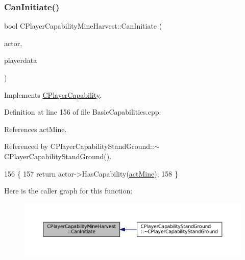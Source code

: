 \subsubsection{\texorpdfstring{Can\+Initiate()}{CanInitiate()}}
{\footnotesize\ttfamily bool C\+Player\+Capability\+Mine\+Harvest\+::\+Can\+Initiate (\begin{DoxyParamCaption}\item[{std\+::shared\+\_\+ptr$<$ \hyperlink{classCPlayerAsset}{C\+Player\+Asset} $>$}]{actor,  }\item[{std\+::shared\+\_\+ptr$<$ \hyperlink{classCPlayerData}{C\+Player\+Data} $>$}]{playerdata }\end{DoxyParamCaption})\hspace{0.3cm}{\ttfamily [virtual]}}



Implements \hyperlink{classCPlayerCapability_aa83b1e1fcaff2985c378132d679154ea}{C\+Player\+Capability}.



Definition at line 156 of file Basic\+Capabilities.\+cpp.



References act\+Mine.



Referenced by C\+Player\+Capability\+Stand\+Ground\+::$\sim$\+C\+Player\+Capability\+Stand\+Ground().


\begin{DoxyCode}
156                                                                                                            
                     \{
157     \textcolor{keywordflow}{return} actor->HasCapability(\hyperlink{GameDataTypes_8h_a35b98ce26aca678b03c6f9f76e4778cea2e0db284fd05caa56e3867c661ccdd8b}{actMine});
158 \}
\end{DoxyCode}
Here is the caller graph for this function\+:\nopagebreak
\begin{figure}[H]
\begin{center}
\leavevmode
\includegraphics[width=350pt]{classCPlayerCapabilityMineHarvest_a37944eb249559f1246348b47e3f24dee_icgraph}
\end{center}
\end{figure}


